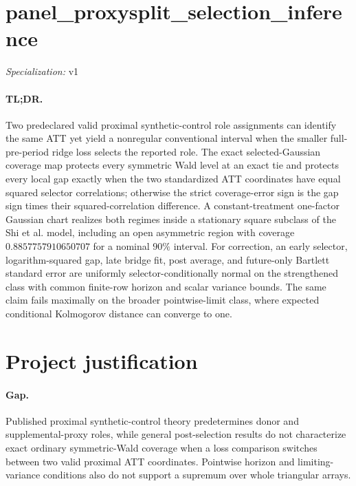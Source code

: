 \documentclass{article}
\begin{document}
\sloppy

\section*{panel\_\allowbreak{}proxysplit\_\allowbreak{}selection\_\allowbreak{}inference}

\noindent\textit{Specialization:} v1\par

\paragraph{TL;DR.} Two predeclared valid proximal synthetic-control role assignments can identify the same ATT yet yield a nonregular conventional interval when the smaller full-pre-period ridge loss selects the reported role. The exact selected-Gaussian coverage map protects every symmetric Wald level at an exact tie and protects every local gap exactly when the two standardized ATT coordinates have equal squared selector correlations; otherwise the strict coverage-error sign is the gap sign times their squared-correlation difference. A constant-treatment one-factor Gaussian chart realizes both regimes inside a stationary square subclass of the Shi et al. model, including an open asymmetric region with coverage \(0.8857757910650707\) for a nominal \(90\%\) interval. For correction, an early selector, logarithm-squared gap, late bridge fit, post average, and future-only Bartlett standard error are uniformly selector-conditionally normal on the strengthened class with common finite-row horizon and scalar variance bounds. The same claim fails maximally on the broader pointwise-limit class, where expected conditional Kolmogorov distance can converge to one.

\section{Project justification}

\paragraph{Gap.} Published proximal synthetic-control theory predetermines donor and supplemental-proxy roles, while general post-selection results do not characterize exact ordinary symmetric-Wald coverage when a loss comparison switches between two valid proximal ATT coordinates. Pointwise horizon and limiting-variance conditions also do not support a supremum over whole triangular arrays.
\end{document}
